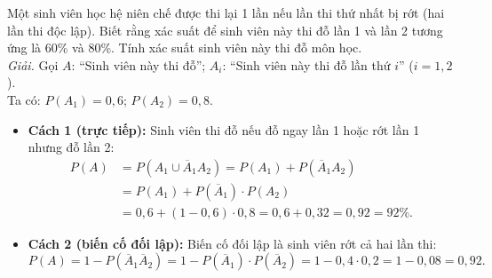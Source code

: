 \begin{vidu}
Một sinh viên học hệ niên chế được thi lại 1 lần nếu lần thi thứ nhất bị rớt (hai lần thi độc lập). Biết rằng xác suất để sinh viên này thi đỗ lần 1 và lần 2 tương ứng là 60\% và 80\%. Tính xác suất sinh viên này thi đỗ môn học.\\
\textit{Giải.} Gọi $A$: ``Sinh viên này thi đỗ''; $A_i$: ``Sinh viên này thi đỗ lần thứ $i$'' ($i = 1, 2$).\\
Ta có: $P(A_1) = 0{,}6$; $P(A_2) = 0{,}8$.
\begin{itemize}
    \item \textbf{Cách 1 (trực tiếp):} Sinh viên thi đỗ nếu đỗ ngay lần 1 hoặc rớt lần 1 nhưng đỗ lần 2:
    \begin{align*}
    P(A) &= P(A_1 \cup \overline{A}_1 A_2) = P(A_1) + P(\overline{A}_1 A_2) \\
         &= P(A_1) + P(\overline{A}_1) \cdot P(A_2) \\
         &= 0{,}6 + (1 - 0{,}6) \cdot 0{,}8 = 0{,}6 + 0{,}32 = 0{,}92 = 92\%.
    \end{align*}
    \item \textbf{Cách 2 (biến cố đối lập):} Biến cố đối lập là sinh viên rớt cả hai lần thi:
    \[
    P(A) = 1 - P(\overline{A}_1 \overline{A}_2) = 1 - P(\overline{A}_1) \cdot P(\overline{A}_2) = 1 - 0{,}4 \cdot 0{,}2 = 1 - 0{,}08 = 0{,}92.
    \]
\end{itemize}
\end{vidu}

